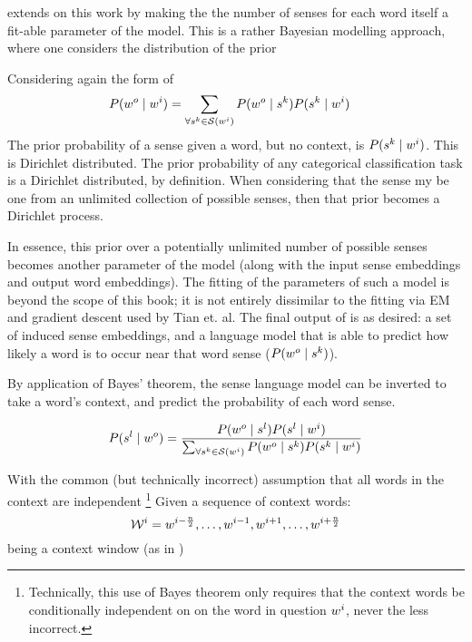 \documentclass[12pt,parskip]{komatufte}
\begin{document}
 extends on this work by making the the number of senses for each word itself a fit-able parameter of the model.
This is a rather Bayesian modelling approach, where one considers the distribution of the prior

Considering again the form of 
\begin{align}
P(\n w_o\mid \n w_i) &= \sum_{\forall \n s_k \in \seq S(\n w_i)} P(\n w_o \mid \n s_k) P(\n s_k \mid \n w_i) 
\end{align}
The prior probability of a sense given a word, but no context, is 
$P(\n s_k \mid \n w_i)$.
This is Dirichlet distributed.
The prior probability of any categorical classification task is a Dirichlet distributed, by  definition.
When considering that the sense my be one from an unlimited collection of possible senses,
then that prior becomes a Dirichlet process.

In essence, this prior over a potentially unlimited number of possible senses becomes another parameter of the model (along with the input sense embeddings and output word embeddings).
The fitting of the parameters of such a model is beyond the scope of this book;
it is not entirely dissimilar to the fitting via EM and gradient descent used by Tian et. al.
The final output of  is as desired:
a set of induced sense embeddings, 
and a language model that is able to predict how likely a word is to occur near that word sense ($P(\n w_o \mid \n s_k)$).

By application of Bayes' theorem, the sense language model can be inverted to take a word's context,
and predict the probability of each word sense.

\begin{equation}
P(\n s_l \mid \n w_o) = \frac{P(\n w_o \mid \n s_l) P(\n s_l \mid \n w_i)}{\sum_{\forall \n s_k \in \seq S(\n w_i)} P(\n w_o \mid \n s_k) P(\n s_k \mid \n w_i)}
\end{equation}

With the common (but technically incorrect) assumption that all words in the context are independent \footnote{Technically, this use of Bayes theorem only requires that the context words be conditionally independent on on the word in question $\n w_i$, never the less incorrect.}
Given a sequence of context words:
\begin{equation}
\n \seq{W}_i = \n w_{i-\frac{n}{2}},\ldots, \n w_{i-1}, \n w_{i+1},\ldots, \n w_{i+\frac{n}{2}}
\end{equation}
being a context window (as in )
\end{document}
